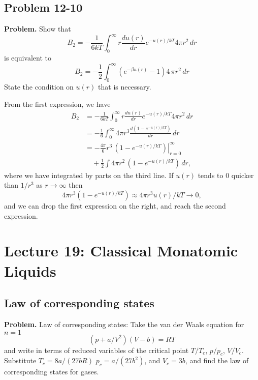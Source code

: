 \documentclass[twocolumn, 10pt]{article}
\numberwithin{equation}{section}
\newenvironment{problem}
{\par\medskip \color{problemblue}
  \textbf{Problem. }\ignorespaces}
{\medskip}
\newenvironment{solution}[1][\empty]
{\par\medskip\sffamily
  \textbf{\ifx\empty#1{Solution.}\relax\else{#1}\fi} \ignorespaces}
{\medskip}
\begin{document}
\subsection{Problem 12-10}

\begin{problem}
  Show that
  $$
  B_2 =
  -\frac{1}{6kT}
  \int_0^\infty
  r \frac{ du(r) } { dr } e^{-u(r)/kT} 4 \pi r^2 \, dr
  $$
  is equivalent to
  $$
  B_2
  =
  -\frac{1}{2}
  \int_0^\infty
  (e^{-\beta u(r)} - 1)
  4 \, \pi r^2 \, dr
  $$
  State the condition on $u(r)$ that is necessary.
\end{problem}

\begin{solution}
  From the first expression, we have
  \begin{align*}
  B_2 &=
  -\frac{1}{6kT}
  \int_0^\infty
  r \frac{ du(r) } { dr } e^{-u(r)/kT} 4 \pi r^2 \, dr
  \\
    &=
  -\frac{1}{6}
  \int_0^\infty
    4 \pi r^3 \frac{ d(1- e^{-u(r)/kT}) } { dr } \, dr
  \\
  &=
  \left.
    -\frac{ 4 \pi }{6} r^3 \, (1- e^{-u(r)/kT})
  \right|_{r=0}^{\infty}
  \\
  &\quad
    +
  \frac{1}{2}
  \int 4 \pi r^2 \, (1- e^{-u(r)/kT}) \, dr
  ,
  \end{align*}
  where we have integrated by parts on the third line.
  If $u(r)$ tends to $0$ quicker than $1/r^3$ as $r \to \infty$
  then
  $$
  4\pi r^3 (1 - e^{-u(r)/kT}) \approx 4 \pi r^3 u(r)/kT \to 0,
  $$
  and we can drop the first expression on the right,
  and reach the second expression.
\end{solution}

\section{Lecture 19: Classical Monatomic Liquids}

\subsection{Law of corresponding states}

\begin{problem}
Law of corresponding states:
Take the van der Waals equation for $n = 1$
$$
\left( p + a/V^2 \right)(V - b) = RT
$$
and write in terms of reduced variables of
the critical point $T/T_c$, $p/p_c$, $V/V_c$.
%
Substitute
  $T_c = 8a/(27bR)$
  $p_c = a/(27b^2)$,
  and
  $V_c = 3b$,
and find the law of corresponding states for gases.
\end{problem}
\end{document}
